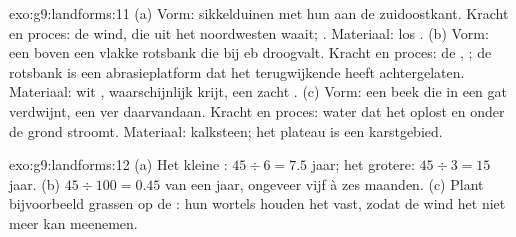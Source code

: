 \begin{solution}{exo:g9:landforms:11}
(a) Vorm: sikkelduinen met hun  aan de zuidoostkant. Kracht en
proces: de wind, die uit het noordwesten waait; . Materiaal: los
. (b) Vorm: een  boven een vlakke rotsbank die bij eb droogvalt.
Kracht en proces: de , ; de rotsbank is een abrasieplatform dat
het terugwijkende  heeft achtergelaten. Materiaal: wit ,
waarschijnlijk krijt, een zacht . (c) Vorm: een beek die in een
gat verdwijnt, een  ver daarvandaan. Kracht en proces: water dat het
 oplost en onder de grond stroomt. Materiaal: kalksteen; het
plateau is een karstgebied.
\end{solution}

\begin{solution}{exo:g9:landforms:12}
(a) Het kleine : $45 \div 6 = 7.5$ jaar; het grotere: $45 \div 3 =
15$ jaar. (b) $45 \div 100 = 0.45$ van een jaar, ongeveer vijf à zes
maanden. (c) Plant bijvoorbeeld grassen op de : hun wortels houden
het  vast, zodat de wind het niet meer kan meenemen.
\end{solution}

